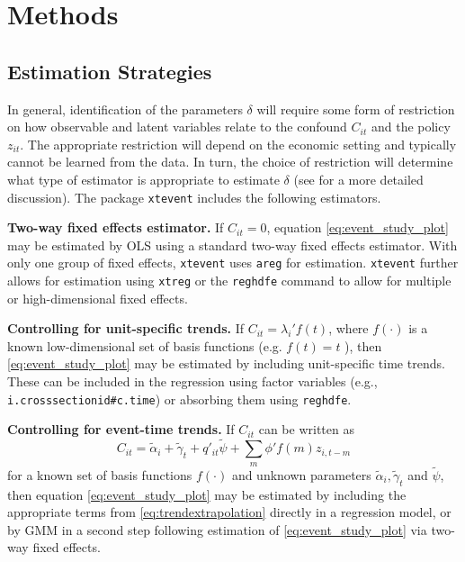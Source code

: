 \documentclass[12pt]{article}
\begin{document}

\section{Methods}\label{sec:methods}

\subsection{Estimation Strategies}\label{sec:estimation}

In general, identification of the parameters $\delta$ will require some form of restriction on how observable and latent variables relate to the confound $C_{it}$ and the policy $z_{it}$.
The appropriate restriction will depend on the economic setting and typically cannot be learned from the data.
In turn, the choice of restriction will determine what type of estimator is appropriate to estimate $\delta$ (see \citeauthor{freyaldenhoven2021visualizationforth} \citeyear{freyaldenhoven2021visualizationforth} for a more detailed discussion).
The package \texttt{xtevent} includes the following estimators.

\noindent \textbf{Two-way fixed effects estimator.}
If $C_{it} = 0$, equation \eqref{eq:event_study_plot} may be estimated by OLS using a standard two-way fixed effects estimator.
With only one group of fixed effects, \texttt{xtevent} uses \texttt{areg} for estimation.
\texttt{xtevent} further allows for estimation using \texttt{xtreg} or the \texttt{reghdfe} command \citep{guimaraes2010simple,Correia2017:HDFE,correia2019reghdfe} to allow for multiple or high-dimensional fixed effects.

\noindent \textbf{Controlling for unit-specific trends.}
If $C_{it} = \lambda_i' f(t)$, where $f(\cdot)$ is a known low-dimensional set of basis functions (e.g. $f(t) = t$ ), then \eqref{eq:event_study_plot} may be estimated by including unit-specific time trends.
These can be included in the regression using factor variables (e.g., \texttt{i.crosssectionid\#c.time}) or absorbing them using \texttt{reghdfe}.

\noindent \textbf{Controlling for event-time trends.}
If $C_{it}$ can be written as
\begin{equation}\label{eq:trendextrapolation}
C_{it} = \tilde{\alpha}_i + \tilde{\gamma}_t + q'_{it} \tilde{\psi} + \sum_{m} \phi' f(m) z_{i,t-m}
\end{equation}
for a known set of basis functions $f(\cdot)$ and unknown parameters $\tilde{\alpha}_i, \tilde{\gamma}_t$ and $\tilde{\psi}$, then equation \eqref{eq:event_study_plot} may be estimated by including the appropriate terms from \eqref{eq:trendextrapolation} directly in a regression model, or by GMM in a second step following estimation of \eqref{eq:event_study_plot}  via two-way fixed effects.
\end{document}
